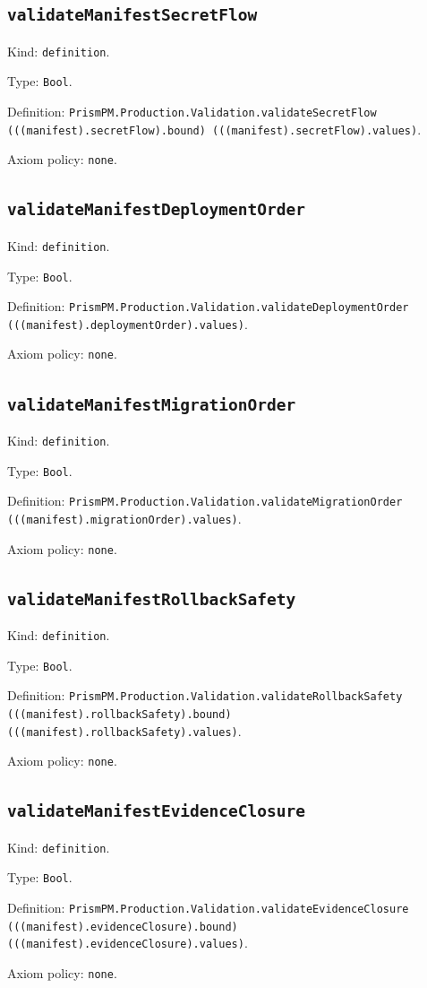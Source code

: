 \documentclass[11pt]{article}
\begin{document}
\subsection*{\texttt{validateManifestSecretFlow}}
\noindent Kind: \texttt{definition}.\par
\noindent Type: \texttt{Bool}.\par
\noindent Definition: \texttt{PrismPM.Production.Validation.validateSecretFlow (((manifest).secretFlow).bound) (((manifest).secretFlow).values)}.\par
\noindent Axiom policy: \texttt{none}.\par
\subsection*{\texttt{validateManifestDeploymentOrder}}
\noindent Kind: \texttt{definition}.\par
\noindent Type: \texttt{Bool}.\par
\noindent Definition: \texttt{PrismPM.Production.Validation.validateDeploymentOrder (((manifest).deploymentOrder).values)}.\par
\noindent Axiom policy: \texttt{none}.\par
\subsection*{\texttt{validateManifestMigrationOrder}}
\noindent Kind: \texttt{definition}.\par
\noindent Type: \texttt{Bool}.\par
\noindent Definition: \texttt{PrismPM.Production.Validation.validateMigrationOrder (((manifest).migrationOrder).values)}.\par
\noindent Axiom policy: \texttt{none}.\par
\subsection*{\texttt{validateManifestRollbackSafety}}
\noindent Kind: \texttt{definition}.\par
\noindent Type: \texttt{Bool}.\par
\noindent Definition: \texttt{PrismPM.Production.Validation.validateRollbackSafety (((manifest).rollbackSafety).bound) (((manifest).rollbackSafety).values)}.\par
\noindent Axiom policy: \texttt{none}.\par
\subsection*{\texttt{validateManifestEvidenceClosure}}
\noindent Kind: \texttt{definition}.\par
\noindent Type: \texttt{Bool}.\par
\noindent Definition: \texttt{PrismPM.Production.Validation.validateEvidenceClosure (((manifest).evidenceClosure).bound) (((manifest).evidenceClosure).values)}.\par
\noindent Axiom policy: \texttt{none}.\par
\end{document}
